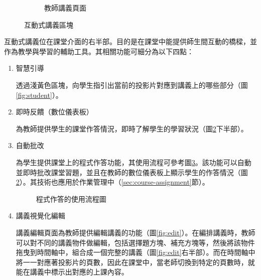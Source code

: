 \begin{figure}[H]
\begin{subfigure}{0.5\linewidth}
    \caption{教師講義頁面}
    \label{fig:teacher}
  \end{subfigure}
  \caption{互動式講義區塊}
\end{figure}

互動式講義位在課堂介面的右半部。目的是在課堂中能提供師生間互動的橋樑，並作為教學與學習的輔助工具。其相關功能可細分為以下四點：

\begin{enumerate}
  \setlength{\parindent}{2em}

  \item 智慧引導
  \par 透過淺黃色區塊，向學生指引出當前的投影片對應到講義上的哪些部分（圖\ref{fig:student}）。
  
  \item 即時反饋（數位儀表板）
  \par 為教師提供學生的課堂作答情況，即時了解學生的學習狀況（圖\ref{fig:teacher}下半部）。

  \item 自動批改
  \par 為學生提供課堂上的程式作答功能，其使用流程可參考圖\ref{fig:problem-flowchart}。該功能可以自動並即時批改課堂習題，並且在教師的數位儀表板上顯示學生的作答情況（圖\ref{fig:teacher}）。其技術也應用於作業管理中（\ref{sec:course-assignment}節）。
  
  \begin{figure}[H]
    \centering
    \caption{程式作答的使用流程圖}
    \label{fig:problem-flowchart}
  \end{figure}

  \item 講義視覺化編輯
  \par 講義編輯頁面為教師提供編輯講義的功能（圖\ref{fig:edit}）。在編排講義時，教師可以對不同的講義物件做編輯，包括選擇題方塊、補充方塊等，然後將該物件拖曳到時間軸中，組合成一個完整的講義（圖\ref{fig:edit}右半部）。而在時間軸中將一一對應著投影片的頁數，因此在課堂中，當老師切換到特定的頁數時，就能在講義中標示出對應的上課內容。


\end{enumerate}
